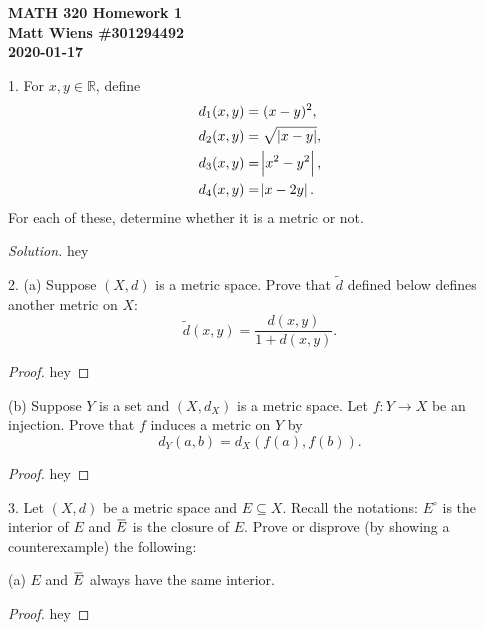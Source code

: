\documentclass{article}
\newcommand{\R}{\mathbb{R}}
\newcommand*\clos[1]{\mkern 1.5mu\overline{\mkern-1.5mu#1\mkern-1.5mu}\mkern 1.5mu}
\begin{document}
\textbf{MATH 320 Homework 1} \\
\textbf{Matt Wiens \#301294492} \\
\textbf{2020-01-17}

1. For $x, y \in \R$, define
%
\begin{align}
    d_1(x, y) &= (x - y)^2,
    \label{eq:q1-1} \\
    d_2(x, y) &= \sqrt{\, \envert{x - y}},
    \label{eq:q1-2} \\
    d_3(x, y) &= \envert{x^2 - y^2},
    \label{eq:q1-3} \\
    d_4(x, y) &= \envert{x - 2 y}.
    \label{eq:q1-4}
\end{align}
%
For each of these, determine whether it is a metric or not.

\textit{Solution.}
hey

\newpage

2. (a) Suppose $(X, d)$ is a metric space. Prove that $\tilde{d}$
   defined below defines another metric on $X$:
%
\begin{equation*}
    \tilde{d} (x, y) = \frac{d(x,y)}{1 + d(x,y)}
    .
\end{equation*}

\begin{proof}

hey

\end{proof}

(b) Suppose $Y$ is a set and $(X, d_X)$ is a metric space. Let $f: Y \to
X$ be an injection. Prove that $f$ induces a metric on $Y$ by
%
\begin{equation*}
    d_Y (a, b) = d_X(f(a), f(b))
    .
\end{equation*}

\begin{proof}

hey

\end{proof}

\newpage

3. Let $(X, d)$ be a metric space and $E \subseteq X$. Recall the
   notations: $E^\circ$ is the interior of $E$ and $\clos{E}$ is the
   closure of $E$. Prove or disprove (by showing a counterexample) the
   following:

   (a) $E$ and $\clos{E}$ always have the same interior.

\begin{proof}

hey

\end{proof}
\end{document}
